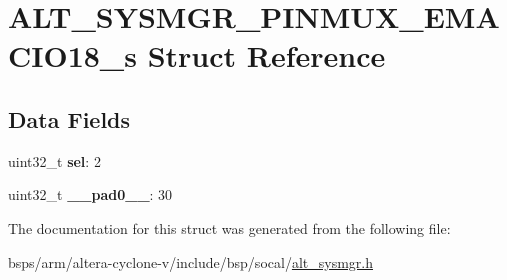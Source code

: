 \hypertarget{structALT__SYSMGR__PINMUX__EMACIO18__s}{}\section{A\+L\+T\+\_\+\+S\+Y\+S\+M\+G\+R\+\_\+\+P\+I\+N\+M\+U\+X\+\_\+\+E\+M\+A\+C\+I\+O18\+\_\+s Struct Reference}
\label{structALT__SYSMGR__PINMUX__EMACIO18__s}
\subsection*{Data Fields}
\begin{DoxyCompactItemize}
\item 
\mbox{\label{structALT__SYSMGR__PINMUX__EMACIO18__s_a03b8da69762a84e1e9534798871d1477}} 
uint32\+\_\+t {\bfseries sel}\+: 2
\item 
\mbox{\label{structALT__SYSMGR__PINMUX__EMACIO18__s_afe8bcc09b6b18a5258e060bfa9613a70}} 
uint32\+\_\+t {\bfseries \+\_\+\+\_\+pad0\+\_\+\+\_\+}\+: 30
\end{DoxyCompactItemize}


The documentation for this struct was generated from the following file\+:\begin{DoxyCompactItemize}
\item 
bsps/arm/altera-\/cyclone-\/v/include/bsp/socal/\mbox{\hyperlink{alt__sysmgr_8h}{alt\+\_\+sysmgr.\+h}}\end{DoxyCompactItemize}
